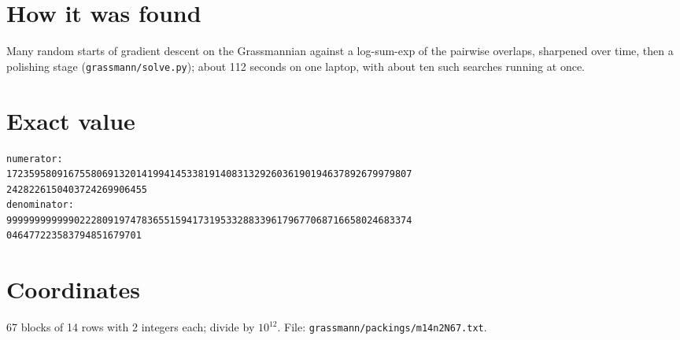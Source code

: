 \documentclass[11pt,a4paper]{article}
\begin{document}
\section{How it was found}
Many random starts of gradient descent on the Grassmannian against a log-sum-exp of the pairwise overlaps, sharpened over time, then a polishing stage (\texttt{grassmann/solve.py}); about 112 seconds on one laptop, with about ten such searches running at once.


\appendix
\section{Exact value}
{\small
\begin{verbatim}
numerator:
172359580916755806913201419941453381914083132926036190194637892679979807
2428226150403724269906455
denominator:
999999999999022280919747836551594173195332883396179677068716658024683374
046477223583794851679701
\end{verbatim}}

\section{Coordinates}
67 blocks of 14 rows with 2 integers each; divide by $10^{12}$. File: \texttt{grassmann/packings/m14n2N67.txt}.
{\tiny
\begin{multicols}{4}
\end{multicols}}
\end{document}
